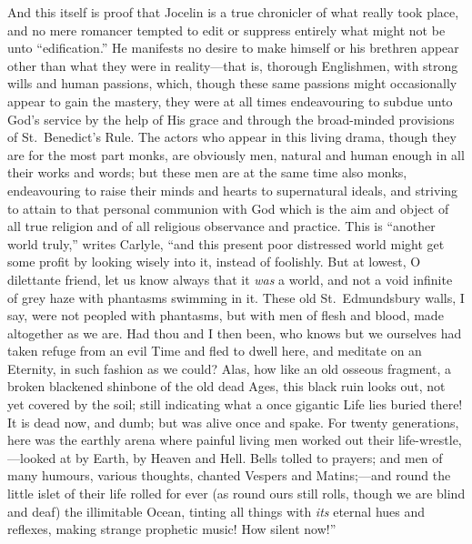 \documentclass[10pt]{book}
\begin{document}
{{{And this itself is proof that Jocelin is a true chronicler of what really took place, and no mere romancer tempted to edit or suppress entirely what might not be unto ``edification.'' He manifests no desire to make himself or his brethren appear other than what they were in reality---that is, thorough Englishmen, with strong wills and human passions, which, though these same passions might occasionally appear to gain the mastery, they were at all times endeavouring to subdue unto God's service by the help of His grace and through the broad-minded provisions of St.\ Benedict's Rule. The actors who appear in this living drama, though they are for the most part monks, are obviously men, natural and human enough in all their works and words; but these men are at the same time also monks, endeavouring to raise their minds and hearts to supernatural ideals, and striving to attain to that personal communion with God which is the aim and object of all true religion and of all religious observance and practice. This is ``another world truly,'' writes Carlyle, ``and this present poor distressed world might get some profit by looking wisely into it, instead of foolishly. But at lowest, O dilettante friend, let us know always that it \emph{was} a world, and not a void infinite of grey haze with phantasms swimming in it. These old St.\ Edmundsbury walls, I say, were not peopled with phantasms, but with men of flesh and blood, made altogether as we are. Had thou and I then been, who knows but we ourselves had taken refuge from an evil Time and fled to dwell here, and meditate on an Eternity, in such fashion as we could? Alas, how like an old osseous fragment, a broken blackened shinbone of the old dead Ages, this black ruin looks out, not yet covered by the soil; still indicating what a once gigantic Life lies buried there! It is dead now, and dumb; but was alive once and spake. For twenty generations, here was the earthly arena where painful living men worked out their life-wrestle,---looked at by Earth, by Heaven and Hell. Bells tolled to prayers; and men of many humours, various thoughts, chanted Vespers and Matins;---and round the little islet of their life rolled for ever (as round ours still rolls, though we are blind and deaf) the illimitable Ocean, tinting all things with \emph{its} eternal hues and reflexes, making strange prophetic music! How silent now!''

}}}
\end{document}
